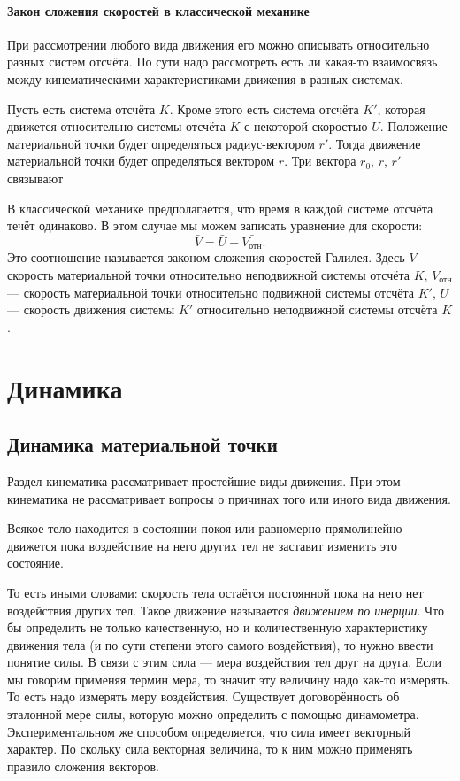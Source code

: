 \documentclass[10pt]{extbook}
\begin{document}
\subsubsection{Закон сложения скоростей в классической механике}

При рассмотрении любого вида движения его можно описывать относительно разных
систем отсчёта. По сути надо рассмотреть есть ли какая-то взаимосвязь между
кинематическими характеристиками движения в разных системах.

Пусть есть система отсчёта \( K \). Кроме этого есть система отсчёта \( K' \),
которая движется относительно системы отсчёта \( K \) с некоторой скоростью \(
U \). Положение материальной точки будет определяться радиус-вектором \( r' \).
Тогда движение материальной точки будет определяться вектором \( \bar{r} \).
Три вектора \( r_0 \), \( r \), \( r' \) связывают

В классической механике предполагается, что время в каждой системе отсчёта
течёт одинаково. В этом случае мы можем записать уравнение для скорости: \[
	\bar{V} = \bar{U} + \bar{V_\text{отн}}
	.\] Это соотношение называется законом сложения скоростей Галилея. Здесь \(
V \) --- скорость материальной точки относительно неподвижной системы отсчёта
\( K \), \( V_\text{отн} \) --- скорость материальной точки относительно
подвижной системы отсчёта \( K' \), \( U \) --- скорость движения системы \(
K' \) относительно неподвижной системы отсчёта \( K \).

\chapter{Динамика}
\section{Динамика материальной точки}%

Раздел кинематика рассматривает простейшие виды движения. При этом кинематика
не рассматривает вопросы о причинах того или иного вида движения.

Всякое тело находится в состоянии покоя или равномерно прямолинейно движется
пока воздействие на него других тел не заставит изменить это состояние.

То есть иными словами: скорость тела остаётся постоянной пока на него нет
воздействия других тел. Такое движение называется \emph{движением по инерции}.
Что бы определить не только качественную, но и количественную характеристику
движения тела (и по сути степени этого самого воздействия), то нужно ввести
понятие силы. В связи с этим сила --- мера воздействия тел друг на друга. Если мы
говорим применяя термин мера, то значит эту величину надо как-то измерять. То
есть надо измерять меру воздействия. Существует договорённость об эталонной
мере силы, которую можно определить с помощью динамометра. Экспериментальном
же способом определяется, что сила имеет векторный характер. По скольку сила
векторная величина, то к ним можно применять правило сложения векторов.
\end{document}
